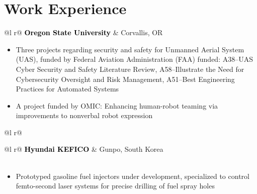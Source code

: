 \documentclass[letterpaper,9pt]{article}
\begin{document}
{\selectfont
\section{Work Experience}
}
\vspace{-2mm}
\begin{tabularx}{\linewidth}{ @{}l r@{} }
\textcolor{Black}{\textbf{Oregon State University}} & \hfill Corvallis, OR \\[1pt]
\end{tabularx}
\vspace{-1em}
\begin{itemize}[nosep,after=\strut, leftmargin=1em, itemsep=1pt, topsep=0pt]
    \item Three projects regarding security and safety for Unmanned Aerial System (UAS), funded by Federal Aviation Administration (FAA) funded: A38--UAS Cyber Security and Safety Literature Review, A58--Illustrate the Need for Cybersecurity Oversight and Risk Management, A51--Best Engineering Practices for Automated Systems
    \item A project funded by OMIC: Enhancing human-robot teaming via improvements to nonverbal robot expression
\end{itemize}
\vspace{-3.5pt}
\begin{tabularx}{\linewidth}{ @{}l r@{} }
\\[2pt]
\end{tabularx}
\vspace{-1em}


\begin{tabularx}{\linewidth}{ @{}l r@{} }
\textcolor{Black}{\textbf{Hyundai KEFICO}} & \hfill Gunpo, South Korea \\[2pt]
\\[1pt]
\end{tabularx}
\vspace{-1em}
\begin{itemize}[nosep,after=\strut, leftmargin=1em, itemsep=2pt]
    \item Prototyped gasoline fuel injectors under development, specialized to control femto-second laser systems for precise drilling of fuel spray holes
\end{itemize}
\end{document}
